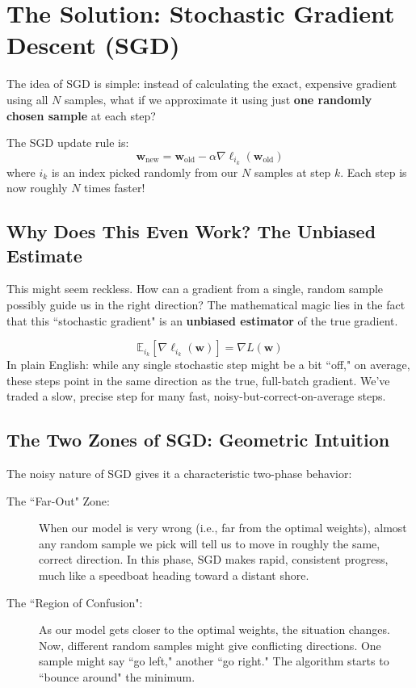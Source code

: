 \documentclass[11pt, a4paper]{article}
\begin{document}
\section{The Solution: Stochastic Gradient Descent (SGD)}
The idea of SGD is simple: instead of calculating the exact, expensive gradient using all $N$ samples, what if we approximate it using just \textbf{one randomly chosen sample} at each step?

The SGD update rule is:
\begin{equation}
\mathbf{w}_{\text{new}} = \mathbf{w}_{\text{old}} - \alpha \nabla \ell_{i_k}(\mathbf{w}_{\text{old}})
\end{equation}
where $i_k$ is an index picked randomly from our $N$ samples at step $k$. Each step is now roughly $N$ times faster!

\subsection{Why Does This Even Work? The Unbiased Estimate}
This might seem reckless. How can a gradient from a single, random sample possibly guide us in the right direction? The mathematical magic lies in the fact that this ``stochastic gradient" is an \textbf{unbiased estimator} of the true gradient.

\begin{equation}
\mathbb{E}_{i_k}[\nabla \ell_{i_k}(\mathbf{w})] = \nabla L(\mathbf{w})
\end{equation}
In plain English: while any single stochastic step might be a bit ``off," on average, these steps point in the same direction as the true, full-batch gradient. We've traded a slow, precise step for many fast, noisy-but-correct-on-average steps.

\subsection{The Two Zones of SGD: Geometric Intuition}
The noisy nature of SGD gives it a characteristic two-phase behavior:

\begin{description}
    \item[The ``Far-Out" Zone:] When our model is very wrong (i.e., far from the optimal weights), almost any random sample we pick will tell us to move in roughly the same, correct direction. In this phase, SGD makes rapid, consistent progress, much like a speedboat heading toward a distant shore.
    \item[The ``Region of Confusion":] As our model gets closer to the optimal weights, the situation changes. Now, different random samples might give conflicting directions. One sample might say ``go left," another ``go right." The algorithm starts to ``bounce around" the minimum.
\end{description}
\end{document}
